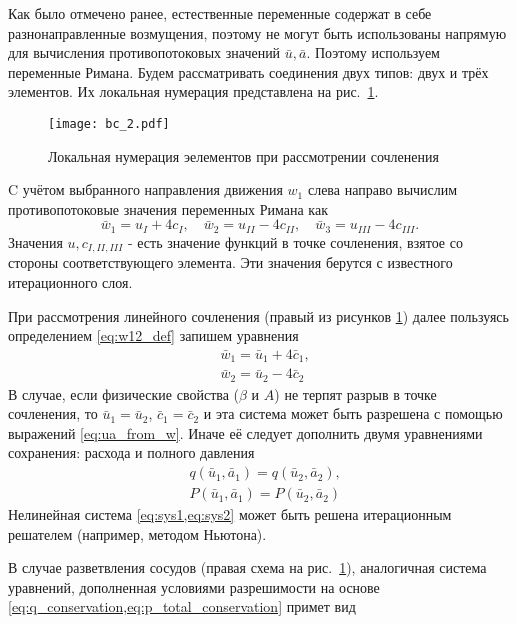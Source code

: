 Как было отмечено ранее, естественные переменные содержат в себе разнонаправленные возмущения, поэтому
не могут быть использованы напрямую для вычисления противопотоковых значений $\bar u, \bar a$.
Поэтому используем переменные Римана. 
Будем рассматривать соединения двух типов: двух и трёх элементов. Их локальная нумерация
представлена на рис.~\ref{fig:bc_2}.

\begin{figure}[h]
    \centering
    \texttt{[image: bc\_2.pdf]}
    \caption{Локальная нумерация эелементов при рассмотрении сочленения}
    \label{fig:bc_2}
\end{figure}

C учётом выбранного направления движения $w_1$ слева направо
вычислим противопотоковые значения переменных Римана как
\begin{equation*}
\bar w_1 = u_I + 4 c_I, \quad \bar w_2 = u_{II} - 4 c_{II}, \quad \bar w_3 = u_{III} - 4 c_{III}.
\end{equation*}
Значения $u,c_{I,II,III}$ - есть значение функций в точке сочленения, взятое
со стороны соответствующего элемента. Эти значения берутся с известного итерационного слоя.

При рассмотрения линейного сочленения (правый из рисунков \ref{fig:bc_2})
далее пользуясь определением \cref{eq:w12_def}
запишем уравнения
\begin{equation}
\label{eq:sys2}
\begin{aligned}
&\bar w_1 = \bar u_1 + 4 \bar c_1, \\
&\bar w_2 = \bar u_2 - 4 \bar c_2
\end{aligned}
\end{equation}
В случае, если физические свойства ($\beta$ и $A$) не терпят разрыв в точке сочленения,
то $\bar u_1 = \bar u_2$, $\bar c_1 = \bar c_2$ и эта система
может быть разрешена с помощью выражений
\cref{eq:ua_from_w}. Иначе её следует дополнить двумя уравнениями сохранения: расхода и полного давления
\begin{equation}
\label{eq:sys1}
\begin{aligned}
&q(\bar u_1, \bar a_1) = q(\bar u_2, \bar a_2), \\
&P(\bar u_1, \bar a_1) = P(\bar u_2, \bar a_2)
\end{aligned}
\end{equation}
Нелинейная система \cref{eq:sys1,eq:sys2} может быть решена итерационным решателем (например, методом Ньютона).

В случае разветвления сосудов (правая схема на рис.~\ref{fig:bc_2}), аналогичная система уравнений,
дополненная условиями разрешимости на основе \cref{eq:q_conservation,eq:p_total_conservation} примет вид

